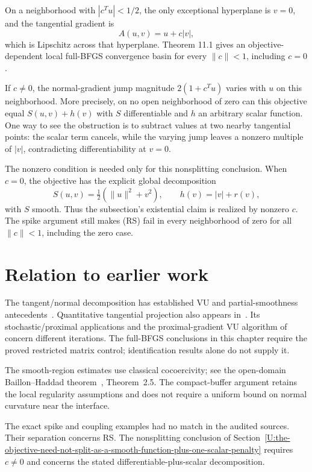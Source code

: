 On a neighborhood with \(|c^Tu|<1/2\), the only exceptional hyperplane
is \(v=0\), and the tangential gradient is \[
 A(u,v)=u+c|v|,
\] which is Lipschitz across that hyperplane. Theorem 11.1 gives an objective-dependent local full-BFGS convergence basin for every $\|c\|<1$, including $c=0$.

If $c\ne0$, the normal-gradient jump magnitude $2(1+c^Tu)$ varies with $u$ on this neighborhood. More precisely, on no open neighborhood of zero can this objective equal $S(u,v)+h(v)$ with $S$ differentiable and $h$ an arbitrary scalar function. One way to see the obstruction is to subtract values at two nearby tangential points: the scalar term cancels, while the varying jump leaves a nonzero multiple of $|v|$, contradicting differentiability at $v=0$.

The nonzero condition is needed only for this nonsplitting conclusion. When $c=0$, the objective has the explicit global decomposition
\[
 S(u,v)=\tfrac12(\|u\|^2+v^2),\qquad h(v)=|v|+r(v),
\]
with $S$ smooth. Thus the subsection's existential claim is realized by nonzero $c$. The spike argument still makes (RS) fail in every neighborhood of zero for all $\|c\|<1$, including the zero case.


\endgroup


\section*{Relation to earlier work}
The tangent/normal decomposition has established VU and partial-smoothness antecedents~\cite{geom_Lewis2002,LL}. Quantitative tangential projection also appears in~\cite{geom_DDJ2026}. Its stochastic/proximal applications and the proximal-gradient VU algorithm of~\cite{geom_LSS2025} concern different iterations. The full-BFGS conclusions in this chapter require the proved restricted matrix control; identification results alone do not supply it.

The smooth-region estimates use classical cocoercivity; see the open-domain Baillon--Haddad theorem~\cite{WW}, Theorem~2.5. The compact-buffer argument retains the local regularity assumptions and does not require a uniform bound on normal curvature near the interface.

The exact spike and coupling examples had no match in the audited sources. Their separation concerns RS. The nonsplitting conclusion of Section~\ref{U:the-objective-need-not-split-as-a-smooth-function-plus-one-scalar-penalty} requires $c\ne0$ and concerns the stated differentiable-plus-scalar decomposition.
